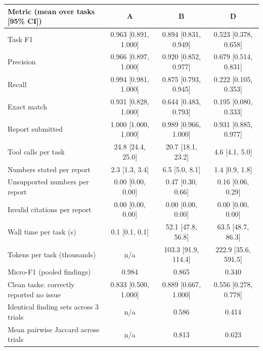\begin{tabular}{@{}lccc@{}}
\toprule
Metric (mean over tasks [95\% CI]) & A & B & D \\
\midrule
Task F1 & 0.963 [0.891, 1.000] & 0.894 [0.831, 0.949] & 0.523 [0.378, 0.658] \\
Precision & 0.966 [0.897, 1.000] & 0.920 [0.852, 0.977] & 0.679 [0.514, 0.831] \\
Recall & 0.994 [0.981, 1.000] & 0.875 [0.793, 0.945] & 0.222 [0.105, 0.353] \\
Exact match & 0.931 [0.828, 1.000] & 0.644 [0.483, 0.793] & 0.195 [0.080, 0.333] \\
Report submitted & 1.000 [1.000, 1.000] & 0.989 [0.966, 1.000] & 0.931 [0.885, 0.977] \\
Tool calls per task & 24.8 [24.4, 25.0] & 20.7 [18.1, 23.2] & 4.6 [4.1, 5.0] \\
Numbers stated per report & 2.3 [1.3, 3.4] & 6.5 [5.0, 8.1] & 1.4 [0.9, 1.8] \\
Unsupported numbers per report & 0.00 [0.00, 0.00] & 0.47 [0.30, 0.66] & 0.16 [0.06, 0.29] \\
Invalid citations per report & 0.00 [0.00, 0.00] & 0.00 [0.00, 0.00] & 0.00 [0.00, 0.00] \\
Wall time per task (s) & 0.1 [0.1, 0.1] & 52.1 [47.8, 56.8] & 63.5 [48.7, 86.3] \\
Tokens per task (thousands) & n/a & 103.3 [91.9, 114.4] & 222.9 [35.6, 591.5] \\
\midrule
Micro-F1 (pooled findings) & 0.984 & 0.865 & 0.340 \\
Clean tasks: correctly reported no issue & 0.833 [0.500, 1.000] & 0.889 [0.667, 1.000] & 0.556 [0.278, 0.778] \\
Identical finding sets across 3 trials & n/a & 0.586 & 0.414 \\
Mean pairwise Jaccard across trials & n/a & 0.813 & 0.623 \\
\bottomrule
\end{tabular}
